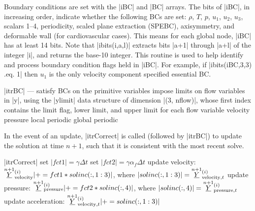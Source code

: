 \documentclass[11pt]{article}
\begin{document}
Boundary conditions are set with the |iBC| and |BC| arrays. The bits of |iBC|, in increasing order, indicate whether the following BCs are set: $\rho$, $T$, $p$, $u_1$, $u_2$, $u_3$, scalars 1--4, periodicity, scaled plane extraction (SPEBC), axisymmetry, and deformable wall (for cardiovascular cases). This means for each global node, |iBC| has at least 14 bits. Note that |ibits(i,a,l)| extracts bits |a+1| through |a+l| of the integer |i|, and returns the base-10 integer. This routine is used to help identify and process boundary condition flags held in |iBC|. For example, if |ibits(iBC,3,3) .eq. 1| then $u_1$ is the only velocity component specified essential BC.
\begin{outline}[deep]
\1 |itrBC| --- satisfy BCs on the primitive variables
	\2 impose limits on flow variables in |y|, using the |ylimit| data structure of dimension |(3, nflow)|, whose first index contains the limit flag, lower limit, and upper limit for each flow variable
	\2 velocity
	\2 pressure
	\2 local periodic
	\2 global periodic
\end{outline}

In the event of an update, |itrCorrect| is called (followed by |itrBC|) to update the solution at time $n+1$, such that it is consistent with the most recent solve.
\begin{outline}[deep]
\1 |itrCorrect|
	\2 set $|fct1| = \gamma \Delta t$
	\2 set $|fct2| = \gamma \alpha_f \Delta t$
	\2 update velocity: $\oset{n+1}{\ul{Y}}^{(i)}_\text{velocity}| += fct1 * solinc(:,1:3)|$, where $|solinc(:,1:3)| = \oset{n+1}{\ul{Y}}^{(i)}_{\text{velocity},t}$
	\2 update pressure: $\oset{n+1}{\ul{Y}}^{(i)}_\text{pressure}| += fct2 * solinc(:,4)|$, where $|solinc(:,4)| = \oset{n+1}{\ul{Y}}^{(i)}_{\text{pressure},t}$
	\2 update acceleration: $\oset{n+1}{\ul{Y}}^{(i)}_{\text{velocity},t}| += solinc(:,1:3)|$
\end{outline}
\end{document}
